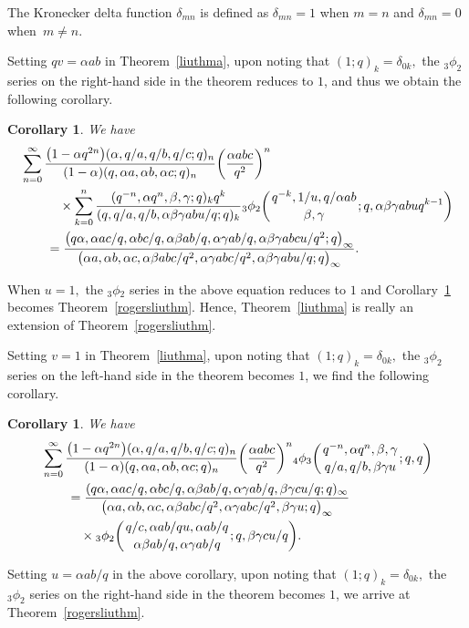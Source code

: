 \documentclass[10pt,a4paper]{amsart}
\numberwithin{equation}{section}
\newtheorem{Corollary}[Theorem]{Corollary}
\begin{document}
 The Kronecker delta function $\delta_{mn}$ is defined as $\delta_{mn}=1$ when $m=n$ and $\delta_{mn}=0$ when~${m\not=n}$.

Setting $qv=\alpha ab$ in Theorem~\ref{liuthma}, upon noting that $(1; q)_k=\delta_{0k},$ the $_3\phi_2$ series on the right-hand side in the theorem reduces to $1$, and thus we obtain the following corollary.
\begin{Corollary}\label{liuthmb} We have
	\begin{align*}
		&\sum_{n=0}^\infty \frac{\bigl(1-\alpha q^{2n}\bigr)(\alpha, q/a, q/b, q/c; q)_n}{(1-\alpha)(q, \alpha a, \alpha b, \alpha c; q)_n}
		\biggl(\frac{\alpha abc}{q^2}\biggr)^n \\
		&\qquad\quad{} \times \sum_{k=0}^{n} \frac{(q^{-n}, \alpha q^n, \beta, \gamma; q)_k q^k}
		{(q, q/a, q/b, \alpha \beta \gamma ab u/q; q)_k}
		{_3\phi_2 \biggl({{q^{-k}, 1/u, q/\alpha ab}\atop{\beta, \gamma}}; q, \alpha \beta \gamma ab u q^{k-1}\biggr)}\\
		&\qquad{}=\frac{\bigl(q\alpha, \alpha ac/q, \alpha bc/q, \alpha \beta ab/q, \alpha \gamma ab/q, \alpha \beta \gamma abcu/q^2; q \bigr)_\infty}{\bigl(\alpha a, \alpha b, \alpha c, \alpha \beta abc/q^2, \alpha \gamma abc/q^2, \alpha \beta \gamma abu/q; q\bigr)_\infty}.
\end{align*}
\end{Corollary}
When $u=1, $ the ${_3}\phi{_2}$ series in the above equation reduces to $1$ and Corollary~\ref{liuthmb} becomes
Theorem~\ref{rogersliuthm}. Hence, Theorem~\ref{liuthma} is really an extension of Theorem~\ref{rogersliuthm}.

Setting $v=1$ in Theorem~\ref{liuthma}, upon noting that $(1; q)_k=\delta_{0k},$ the $_3\phi_2$ series
on the left-hand side in the theorem becomes $1$, we find the following corollary.

\begin{Corollary}\label{liuthmc} We have
	\begin{align*}
		&\sum_{n=0}^\infty \frac{\bigl(1-\alpha q^{2n}\bigr)(\alpha, q/a, q/b, q/c; q)_n}{(1-\alpha)(q, \alpha a, \alpha b, \alpha c; q)_n}\biggl(\frac{\alpha abc}{q^2}\biggr)^n {_4\phi_3}\biggl({{q^{-n}, \alpha q^n, \beta, \gamma}
			\atop{q/a, q/b, \beta \gamma u}}; q, q\biggr)\\
		&\qquad{}=\frac{(q\alpha, \alpha ac/q, \alpha bc/q, \alpha \beta ab/q, \alpha \gamma ab/q, \beta \gamma cu/q; q )_\infty}{\bigl(\alpha a, \alpha b, \alpha c, \alpha \beta abc/q^2, \alpha \gamma abc/q^2, \beta \gamma u; q \bigr)_\infty}\\
		&\qquad\quad{} \times{_3\phi_2} \biggl({{q/c, \alpha ab/qu, \alpha ab/q}\atop{\alpha \beta ab/q, \alpha \gamma ab/q}}; q, \beta \gamma cu/q \biggr).
	\end{align*}
\end{Corollary}
Setting $u=\alpha ab/q $ in the above corollary, upon noting that $(1; q)_k=\delta_{0k},$ the $_3\phi_2$ series
on the right-hand side in the theorem becomes $1$, we arrive at Theorem~\ref{rogersliuthm}.
\end{document}
